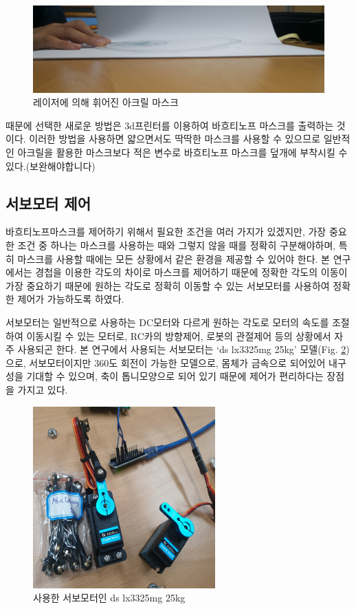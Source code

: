 \documentclass[twoside,11pt]{gshs_thesis}
\begin{document}
\bigskip
\begin{figure}[h]
	\begin{center}
		\includegraphics[width = 12 cm]{bendmask}
	\end{center}
	\caption{레이저에 의해 휘어진 아크릴 마스크}
	\label{bendmask}
\end{figure}


때문에 선택한 새로운 방법은 3d프린터를 이용하여 바흐티노프 마스크를 출력하는 것이다. 이러한 방법을 사용하면 얇으면서도 딱딱한 마스크를 사용할 수 있으므로 일반적인 아크릴을 활용한 마스크보다 적은 변수로 바흐티노프 마스크를 덮개에 부착시킬 수 있다.(보완해야합니다)

\subsection{서보모터 제어}
 바흐티노프마스크를 제어하기 위해서 필요한 조건을 여러 가지가 있겠지만, 가장 중요한 조건 중 하나는 마스크를 사용하는 때와 그렇지 않을 때를 정확히 구분해야하며, 특히 마스크를 사용할 때에는 모든 상황에서 같은 환경을 제공할 수 있어야 한다. 본 연구에서는 경첩을 이용한 각도의 차이로 마스크를 제어하기 때문에 정확한 각도의 이동이 가장 중요하기 때문에 원하는 각도로 정확히 이동할 수 있는 서보모터를 사용하여 정확한 제어가 가능하도록 하였다.
 
 
 서보모터는 일반적으로 사용하는 DC모터와 다르게 원하는 각도로 모터의 속도를 조절하여 이동시킬 수 있는 모터로,  RC카의 방향제어, 로봇의 관절제어 등의 상황에서 자주 사용되곤 한다. 본 연구에서 사용되는 서보모터는 ‘ds lx3325mg 25kg’ 모델(Fig. \ref{motor})으로, 서보모터이지만 360도 회전이 가능한 모델으로, 몸체가 금속으로 되어있어 내구성을 기대할 수 있으며, 축이 톱니모양으로 되어 있기 때문에 제어가 편리하다는 장점을 가지고 있다.
 
  \begin{figure}[h]
 	\begin{center}
 		\includegraphics[width = 7cm]{servo1}
 	\end{center}
 	\caption{사용한 서보모터인 ds lx3325mg 25kg}
 	\label{motor}
 \end{figure}
 
\end{document}
